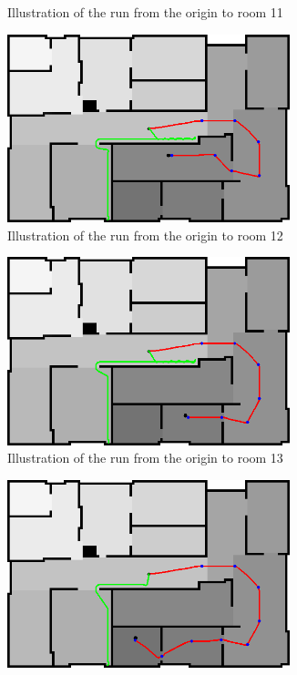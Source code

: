 \documentclass[../Head/Main.tex]{subfiles}
\begin{document}
\begin{figure}[H]
\begin{subfigure}[b]{0.49\textwidth}
    \caption{Illustration of the run from the origin to room 11}
    \label{fig:Test11}
  \end{subfigure}
  \hfill
  \begin{subfigure}[b]{0.49\textwidth}
    \centering
    \includegraphics[width=0.9\textwidth]{Modelbased_vs_Sensorbased/brushfireAndBugTest12}
    \caption{Illustration of the run from the origin to room 12}
    \label{fig:Test12}
  \end{subfigure}
  \begin{subfigure}[b]{0.49\textwidth}
    \centering
    \includegraphics[width=0.9\textwidth]{Modelbased_vs_Sensorbased/brushfireAndBugTest13}
    \caption{Illustration of the run from the origin to room 13}
    \label{fig:Test13}
  \end{subfigure}
  \hfill
  \begin{subfigure}[b]{0.49\textwidth}
    \centering
    \includegraphics[width=0.9\textwidth]{Modelbased_vs_Sensorbased/brushfireAndBugTest14}

\end{subfigure}
\end{figure}
\end{document}
